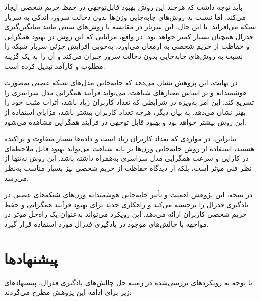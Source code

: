 باید توجه داشت که هرچند این روش بهبود قابل‌توجهی در حفظ حریم شخصی ایجاد می‌کند، اما نسبت به روش‌های جابه‌جایی وزن‌ها بدون دخالت سرور، اندکی به سربار شبکه می‌افزاید. با این حال، این سربار در مقایسه با روش‌های سنتی مانند میانگین‌گیری فدرال همچنان بسیار کمتر خواهد بود. در واقع، مزایایی که این روش در بهبود همگرایی و حفاظت از حریم شخصی به ارمغان می‌آورد، به‌خوبی افزایش جزئی سربار شبکه را نسبت به روش‌های جابه‌جایی بدون دخالت سرور جبران می‌کند و آن را به یک گزینه مطلوب و کارآمد تبدیل کرده است.

در نهایت، این پژوهش نشان می‌دهد که جابه‌جایی مدل‌های شبکه عصبی به‌صورت هوشمندانه و بر اساس معیارهای شباهت، می‌تواند فرآیند همگرایی مدل سراسری را تسریع کند. این امر به‌ویژه در شرایطی که تعداد کاربران زیاد باشد، اثرات مثبت خود را بهتر نشان می‌دهد. به بیان دیگر، هرچه تعداد کاربران بیشتر باشد، مزایای استفاده از این روش بیشتر خواهد بود و بهبود قابل توجهی در فرآیند همگرایی مشاهده می‌شود.

بنابراین، در مواردی که تعداد کاربران زیاد است و داده‌ها بسیار متفاوت و پراکنده هستند، استفاده از روش‌ جابه‌جایی وزن‌ها بر پایه شباهت می‌تواند بهبود قابل ملاحظه‌ای در کارایی و سرعت همگرایی مدل سراسری به‌همراه داشته باشد. این روش نه‌تنها از نظر فنی مؤثر است، بلکه از دیدگاه حفاظت از حریم شخصی نیز بسیار مناسب به‌نظر می‌رسد.

در نتیجه، این پژوهش اهمیت و تأثیر جابه‌جایی هوشمندانه وزن‌های شبکه‌های عصبی در یادگیری فدرال را برجسته می‌کند و راهکاری جدید برای بهبود فرآیند همگرایی و حفظ حریم شخصی کاربران ارائه می‌دهد. این رویکرد می‌تواند به‌عنوان یک راه‌حل مؤثر در مواجهه با چالش‌های موجود در یادگیری فدرال مورد استفاده قرار گیرد.



\section{پیشنهادها}
با توجه به رویکردهای بررسی‌شده در زمینه حل چالش‌های یادگیری فدرال، پیشنهادهای زیر برای ادامه این پژوهش مطرح می‌گردند:


